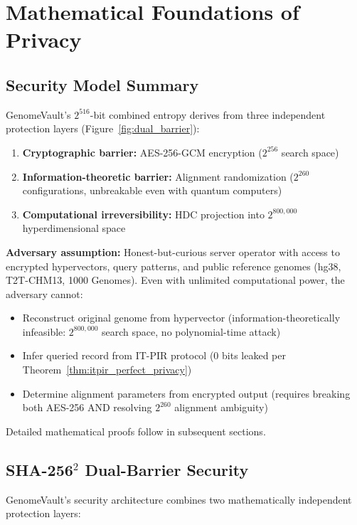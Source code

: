 \documentclass[12pt,a4paper]{article}
\begin{document}
\section{Mathematical Foundations of Privacy}

\subsection{Security Model Summary}

GenomeVault's $2^{516}$-bit combined entropy derives from three independent protection layers (Figure~\ref{fig:dual_barrier}):

\begin{enumerate}
\item \textbf{Cryptographic barrier:} AES-256-GCM encryption ($2^{256}$ search space)
\item \textbf{Information-theoretic barrier:} Alignment randomization ($2^{260}$ configurations, unbreakable even with quantum computers)
\item \textbf{Computational irreversibility:} HDC projection into $2^{800,000}$ hyperdimensional space
\end{enumerate}

\textbf{Adversary assumption:} Honest-but-curious server operator with access to encrypted hypervectors, query patterns, and public reference genomes (hg38, T2T-CHM13, 1000 Genomes). Even with unlimited computational power, the adversary cannot:
\begin{itemize}
\item Reconstruct original genome from hypervector (information-theoretically infeasible: $2^{800,000}$ search space, no polynomial-time attack)
\item Infer queried record from IT-PIR protocol (0 bits leaked per Theorem~\ref{thm:itpir_perfect_privacy})
\item Determine alignment parameters from encrypted output (requires breaking both AES-256 AND resolving $2^{260}$ alignment ambiguity)
\end{itemize}

Detailed mathematical proofs follow in subsequent sections.

\subsection{SHA-256$^2$ Dual-Barrier Security}

GenomeVault's security architecture combines two mathematically independent protection layers:
\end{document}
